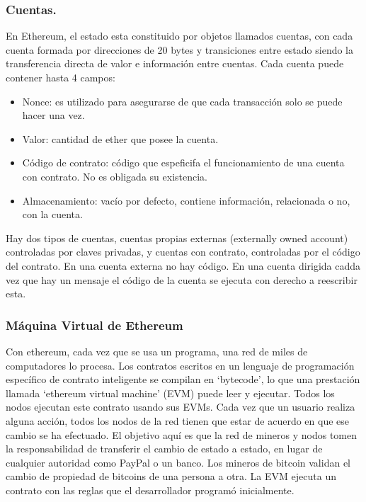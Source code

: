 \documentclass[11pt,a4paper]{article}
\begin{document}
\subsubsection{Cuentas.}
En Ethereum, el estado esta constituido por objetos llamados cuentas, con cada cuenta formada por direcciones de 20 bytes y transiciones entre estado siendo la transferencia directa de valor e información entre cuentas. Cada cuenta puede contener hasta 4 campos:
\begin{itemize}
	\item Nonce: es utilizado para asegurarse de que cada transacción solo se puede hacer una vez.
	\item Valor: cantidad de ether que posee la cuenta.
	\item Código de contrato: código que espeficifa el funcionamiento de una cuenta con contrato. No es obligada su existencia.
	\item Almacenamiento: vacío por defecto, contiene información, relacionada o no, con la cuenta.
\end{itemize}

Hay dos tipos de cuentas, cuentas propias externas (externally owned account) controladas por claves privadas, y cuentas con contrato, controladas por el código del contrato. En una cuenta externa no hay código. En una cuenta dirigida cadda vez que hay un mensaje el código de la cuenta se ejecuta con derecho a reescribir esta.

\subsubsection{Máquina Virtual de Ethereum}
Con ethereum, cada vez que se usa un programa, una red de miles de computadores lo procesa. Los contratos escritos en un lenguaje de programación específico de contrato inteligente se compilan en ‘bytecode’, lo que una prestación llamada ‘ethereum virtual machine’ (EVM) puede leer y ejecutar. Todos los nodos ejecutan este contrato usando sus EVMs.  Cada vez que un usuario realiza alguna acción, todos los nodos de la red tienen que estar de acuerdo en que ese cambio se ha efectuado.
El objetivo aquí es que la red de mineros y nodos tomen la responsabilidad de transferir el cambio de estado a estado, en lugar de cualquier autoridad como PayPal o un banco. Los mineros de bitcoin validan el cambio de propiedad de bitcoins de una persona a otra. La EVM ejecuta un  contrato con las reglas que el desarrollador programó inicialmente. \\
\end{document}
